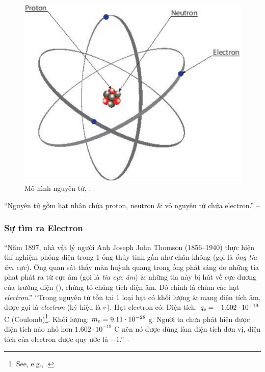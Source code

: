 \documentclass{article}
\numberwithin{equation}{section}
\begin{document}
\begin{figure}[h]
	\centering
	\includegraphics[scale=0.15]{mo_hinh_nguyen_tu}
	\caption{Mô hình nguyên tử, \cite[Hình 2.1, p. 13]{SGK_Hoa_Hoc_10_Chan_Troi_Sang_Tao}.}
\end{figure}
``Nguyên tử gồm hạt nhân chứa proton, neutron \& vỏ nguyên tử chứa electron.'' -- \cite[p. 14]{SGK_Hoa_Hoc_10_Chan_Troi_Sang_Tao}

\subsubsection{Sự tìm ra Electron}
``Năm 1897, nhà vật lý người Anh Joseph John Thomson (1856--1940) thực hiện thí nghiệm phóng điện trong 1 ống thủy tinh gần như chân không (gọi là \textit{ống tia âm cực}). Ông quan sát thấy màn huỳnh quang trong ống phát sáng do những tia phat phát ra từ cực âm (gọi là \textit{tia cực âm}) \& những tia này bị hút về cực dương của trường điện  (\cite[Hình 2.2: \textsf{Thí nghiệm của Thomson}, p. 13]{SGK_Hoa_Hoc_10_Chan_Troi_Sang_Tao}), chứng tỏ chúng tích điện âm. Đó chính là chùm các hạt \textit{electron}.'' ``Trong nguyên tử tồn tại 1 loại hạt có khối lượng \& mang điện tích âm, được gọi là \textit{electron} (ký hiệu là $\rm e$). Hạt electron có: Điện tích: $q_{\rm e} = -1.602\cdot 10^{-19}$ C (Coulomb)\footnote{See, e.g., \cite{SGK_Vat_Ly_11_co_ban, SGK_Vat_Ly_11_nang_cao}.}. Khối lượng: $m_{\rm e} = 9.11\cdot 10^{-28}$ g. Người ta chưa phát hiện được điện tích nào nhỏ hơn $1.602\cdot 10^{-19}$ C nên nó được dùng làm điện tích đơn vị, điện tích của electron được quy ước là $-1$.'' -- \cite[p. 14]{SGK_Hoa_Hoc_10_Chan_Troi_Sang_Tao}
\end{document}
